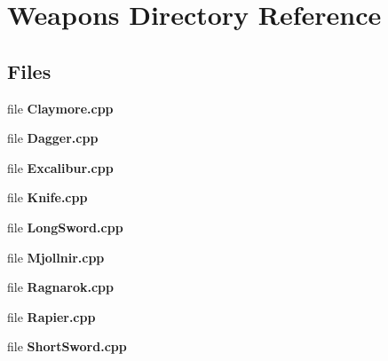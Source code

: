 \section{Weapons Directory Reference}
\label{dir_82cf1390f354fe976e6128e4c68a64f3}
\subsection*{Files}
\begin{DoxyCompactItemize}
\item 
file {\bf Claymore.\-cpp}
\item 
file {\bf Dagger.\-cpp}
\item 
file {\bf Excalibur.\-cpp}
\item 
file {\bf Knife.\-cpp}
\item 
file {\bf Long\-Sword.\-cpp}
\item 
file {\bf Mjollnir.\-cpp}
\item 
file {\bf Ragnarok.\-cpp}
\item 
file {\bf Rapier.\-cpp}
\item 
file {\bf Short\-Sword.\-cpp}
\end{DoxyCompactItemize}
